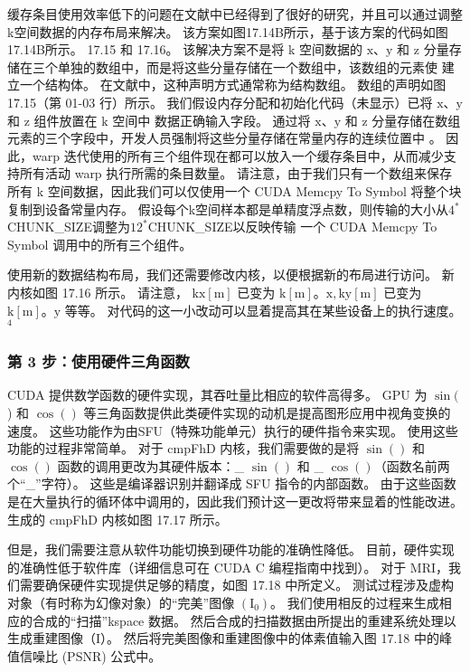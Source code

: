 缓存条目使用效率低下的问题在文献中已经得到了很好的研究，并且可以通过调整k空间数据的内存布局来解决。 该方案如图17.14B所示，基于该方案的代码如图17.14B所示。 17.15 和 17.16。 该解决方案不是将 k 空间数据的 $\mathrm{x}、\mathrm{y}$ 和 $\mathrm{z}$ 分量存储在三个单独的数组中，而是将这些分量存储在一个数组中，该数组的元素使 建立一个结构体。 在文献中，这种声明方式通常称为结构数组。 数组的声明如图 17.15（第 01-03 行）所示。 我们假设内存分配和初始化代码（未显示）已将 $\mathrm{x}、\mathrm{y}$ 和 $\mathrm{z}$ 组件放置在 $\mathrm{k}$ 空间中 数据正确输入字段。 通过将 $\mathrm{x}、\mathrm{y}$ 和 $\mathrm{z}$ 分量存储在数组元素的三个字段中，开发人员强制将这些分量存储在常量内存的连续位置中 。 因此，warp 迭代使用的所有三个组件现在都可以放入一个缓存条目中，从而减少支持所有活动 warp 执行所需的条目数量。 请注意，由于我们只有一个数组来保存所有 k 空间数据，因此我们可以仅使用一个 CUDA Memcpy To Symbol 将整个块复制到设备常量内存。 假设每个k空间样本都是单精度浮点数，则传输的大小从$4{}^{*}$CHUNK\_SIZE调整为$12^{*}$CHUNK\_SIZE以反映传输 一个 CUDA Memcpy To Symbol 调用中的所有三个组件。

使用新的数据结构布局，我们还需要修改内核，以便根据新的布局进行访问。 新内核如图 17.16 所示。 请注意， $\mathrm{kx}[\mathrm{m}]$ 已变为 $\mathrm{k}[\mathrm{m}] 。 \mathrm{x}, \mathrm{ky}[\mathrm{m}]$ 已变为 $\mathrm{k}[\mathrm{m}] 。 \mathrm{y}$ 等等。 对代码的这一小改动可以显着提高其在某些设备上的执行速度。 ${ }^{4}$

\subsubsection{第 3 步：使用硬件三角函数}
CUDA 提供数学函数的硬件实现，其吞吐量比相应的软件高得多。 GPU 为 $\sin ($ ) 和 $\cos ()$ 等三角函数提供此类硬件实现的动机是提高图形应用中视角变换的速度。 这些功能作为由SFU（特殊功能单元）执行的硬件指令来实现。 使用这些功能的过程非常简单。 对于 cmpFhD 内核，我们需要做的是将 $\sin ()$ 和 $\cos ()$ 函数的调用更改为其硬件版本：\_ $\sin ()$ 和 \_ $ \cos ()$（函数名前两个“\_”字符）。 这些是编译器识别并翻译成 SFU 指令的内部函数。 由于这些函数是在大量执行的循环体中调用的，因此我们预计这一更改将带来显着的性能改进。 生成的 cmpFhD 内核如图 17.17 所示。

但是，我们需要注意从软件功能切换到硬件功能的准确性降低。 目前，硬件实现的准确性低于软件库（详细信息可在 CUDA C 编程指南中找到）。 对于 MRI，我们需要确保硬件实现提供足够的精度，如图 17.18 中所定义。 测试过程涉及虚构对象（有时称为幻像对象）的“完美”图像 $\left(\mathrm{I}_{0}\right)$。 我们使用相反的过程来生成相应的合成的“扫描”kspace 数据。 然后合成的扫描数据由所提出的重建系统处理以生成重建图像（I）。 然后将完美图像和重建图像中的体素值输入图 17.18 中的峰值信噪比 (PSNR) 公式中。

